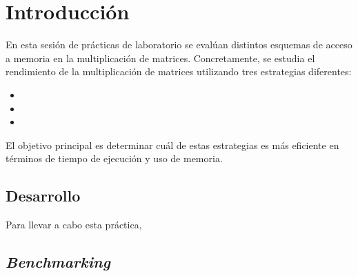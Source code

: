 \pagestyle{fancy}
\fancyhead[l]{\autorUO}
\fancyfoot[l]{\asignaturaAbbr}
\fancyfoot[r]{\fecha}

\section{Introducción}
En esta sesión de prácticas de laboratorio se evalúan distintos esquemas de acceso a memoria en la multiplicación de matrices.
Concretamente, se estudia el rendimiento de la multiplicación de matrices utilizando tres estrategias diferentes:

\begin{itemize}
    \item \rowmajor
    \item \colmajor
    \item \zorder
\end{itemize}
El objetivo principal es determinar cuál de estas estrategias es más eficiente en términos de tiempo de ejecución y uso de memoria.

\subsection{Desarrollo}
Para llevar a cabo esta práctica, 

\subsection{\textit{Benchmarking}}
